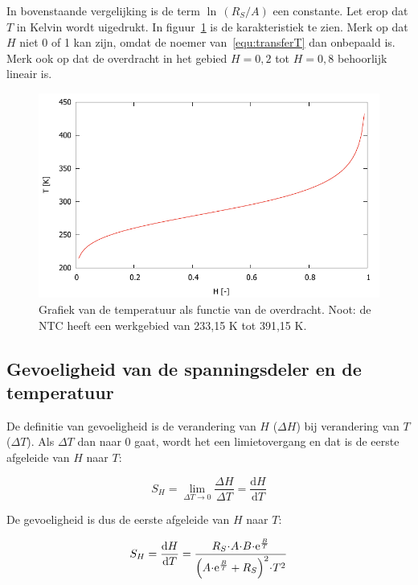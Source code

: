 \documentclass[12pt,a4paper,final,twoside,fleqn]{article}
\let\oldcdot\cdot
\renewcommand{\cdot}{\kern-.10em\oldcdot\kern-.10em}
\begin{document}
In bovenstaande vergelijking is de term $\ln\,(R_S/A)$ een constante.
Let erop dat $T$ in Kelvin wordt uigedrukt.
In figuur~\ref{fig:transferfunctionT} is de karakteristiek te zien. Merk op
dat $H$ niet 0 of 1 kan zijn, omdat de noemer van~\eqref{equ:transferT} dan
onbepaald is. Merk ook op dat de overdracht in het gebied $H=0,2$ tot $H=0,8$
behoorlijk lineair is.


\begin{figure}[ht!]
\centering
\includegraphics[scale=1]{gnuplot/transferfunctionT}
\caption[Grafiek van de temperatuur als functie van de overdracht]{Grafiek van de temperatuur als functie van de overdracht. Noot:
de NTC heeft een werkgebied van 233,15 K tot 391,15 K.}
\label{fig:transferfunctionT}
\end{figure}

\subsection{Gevoeligheid van de spanningsdeler en de temperatuur}
De definitie van gevoeligheid is de verandering van $H$ ($\Delta H$) bij verandering van $T$ ($\Delta T$). Als $\Delta T$ dan naar 0  gaat, wordt het een limietovergang en dat is de eerste afgeleide van $H$ naar $T$:

\begin{equation}
S_H = \lim_{\Delta T \to 0} \dfrac{\Delta H}{\Delta T} = \dfrac{\text{d}H}{\text{d}T}
\end{equation}

De gevoeligheid is dus de eerste afgeleide van $H$ naar $T$:

\begin{equation}
S_H = \dfrac{\text{d}H}{\text{d}T} = 
\dfrac{R_S\cdot A\cdot B\cdot\text{e}^\frac{B}{T}}{\left(A\cdot\text{e}^\frac{B}{T}+R_S\right)^2\cdot T^2} 
\end{equation}
\end{document}
